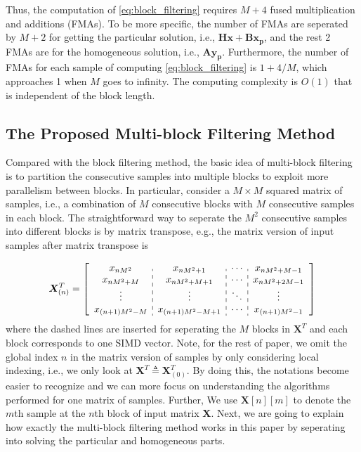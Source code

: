 Thus, the computation of \eqref{eq:block_filtering} requires $M+4$ fused multiplication and additions (FMAs).
To be more specific, the number of FMAs are seperated by $M{+}2$ for getting the particular solution, i.e.,
$\bm{H}\bm{x}+\bm{B}\bm{x_p}$, and the rest 2 FMAs are for the homogeneous solution, i.e., $\bm{Ay_p}$.
Furthermore, the number of FMAs for each sample of computing \eqref{eq:block_filtering} is $1{+}4/M$, which  
approaches 1 when $M$ goes to infinity. The computing complexity is $O(1)$ that is independent of the block length. 

\subsection{The Proposed Multi-block Filtering Method}

Compared with the block filtering method, the basic idea of multi-block filtering is to partition the consecutive samples into multiple blocks to exploit more
parallelism between blocks.
In particular, consider a $M \times M$ squared matrix of samples, i.e., a combination of $M$ consecutive blocks with $M$ consecutive samples in each block.
The straightforward way to seperate the $M^2$ consecutive samples into different blocks is by matrix transpose, 
e.g., the matrix version of input samples after matrix transpose is 

\begin{equation*}
    \begin{aligned}
    \bm{X}^T_{(n)} = \left[
        \begin{array}{c:c:c:c}
        x_{nM^2} & x_{nM^2+1} & \cdots & x_{nM^2+M-1} \\ 
        x_{nM^2+M} & x_{nM^2+M+1} & \cdots & x_{nM^2+2M-1} \\
        \vdots & \vdots & \ddots & \vdots \\
        x_{(n+1)M^2-M} & x_{(n+1)M^2-M+1} &\cdots & x_{(n+1)M^2-1} \\
        \end{array}\right]
    \end{aligned}
\end{equation*}
where the dashed lines are inserted for seperating the $M$ blocks in $\bm{X}^T$ and each block corresponds to one SIMD vector.
Note, for the rest of paper, we omit the global index $n$ in the matrix version of samples by only considering local indexing, i.e.,
we only look at $\bm{X}^T\triangleq\bm{X}^T_{(0)}$. By doing this, the notations become easier to recognize and we can more focus on understanding
the algorithms performed for one matrix of samples.
Further,
We use $\bm{X}[n][m]$ to denote the $m$th sample at the $n$th block
of input matrix $\bm{X}$. Next, we are going to explain how exactly the multi-block filtering method works in this paper 
by seperating into solving the particular and homogeneous parts.

